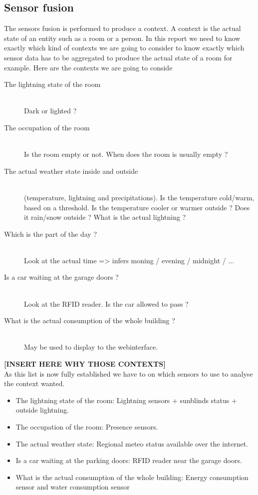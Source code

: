 \documentclass{acm_proc_article-sp}
\begin{document}
\subsection{Sensor fusion}
The sensors fusion is performed to produce a context. A context is the actual state of an entity such as a room or a person. In this report we need to know exactly which kind of contexts we are going to consider to know exactly which sensor data has to be aggregated to produce the actual state of a room for example. Here are the contexts we are going to conside
\begin{description}
 \item[The lightning state of the room]\hfill \\ 
 Dark or lighted ?
 \item[The occupation of the room]\hfill \\ 
 Is the room empty or not. When does the room is usually empty ?
 \item[The actual weather state inside and outside]\hfill \\
 (temperature, lightning and precipitations). 
 Is the temperature cold/warm, based on a threshold. Is the temperature cooler or warmer outside ? 
 Does it rain/snow outside ? What is the actual lightning ?
 \item[Which is the part of the day ?] \hfill \\
 Look at the actual time => infers moning / evening / midnight / ...
 \item[Is a car waiting at the garage doors ?] \hfill \\
  Look at the RFID reader. Is the car allowed to pass ?
 \item[What is the actual consumption of the whole building ?]\hfill \\
 May be used to display to the webinterface.
\end{description}
\textbf{[INSERT HERE WHY THOSE CONTEXTS]}\\
As this list is now fully established we have to on which sensors to use to analyse the context wanted.
\begin{itemize}
 \item The lightning state of the room: Lightning sensors + sunblinds status + outside lightning.
 \item The occupation of the room: Presence sensors.
 \item The actual weather state: Regional meteo status available over the internet.
 \item Is a car waiting at the parking doors: RFID reader near the garage doors.
 \item What is the actual consumption of the whole building: Energy consumption sensor and water consumption sensor
\end{itemize}
\end{document}
